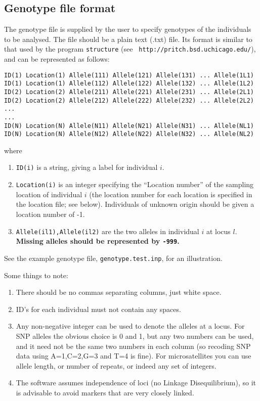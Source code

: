 \documentclass[11pt,titlepage,times,letterpaper]{article}
\begin{document}
\subsection{Genotype file format}
\label{inputfile}

The genotype file is supplied by the user to specify genotypes of the
individuals to be analysed. The file should be a plain text (.txt) file.
Its format is similar to that
used by the program {\tt structure} (see {\tt
http://pritch.bsd.uchicago.edu/}), and can be represented as follows:

\begin{verbatim}
ID(1) Location(1) Allele(111) Allele(121) Allele(131) ... Allele(1L1)
ID(1) Location(1) Allele(112) Allele(122) Allele(132) ... Allele(1L2)
ID(2) Location(2) Allele(211) Allele(221) Allele(231) ... Allele(2L1)
ID(2) Location(2) Allele(212) Allele(222) Allele(232) ... Allele(2L2)
...
...
ID(N) Location(N) Allele(N11) Allele(N21) Allele(N31) ... Allele(NL1)
ID(N) Location(N) Allele(N12) Allele(N22) Allele(N32) ... Allele(NL2)
\end{verbatim}
where
\begin{enumerate}
\item{\tt ID(i)} is a string, giving a label for individual $i$.
\item{\tt Location(i)} is an integer specifying the ``Location number'' of
the sampling location
of individual $i$ (the location number for each location 
is specified in the location file; see below). Individuals of unknown
origin should be given a location number of -1.
\item{{\tt Allele(il1),Allele(il2)}} are the two alleles in
individual $i$ at locus $l$. {\bf Missing alleles should
be represented by {\tt -999}.}
\end{enumerate}
See the example genotype file, {\tt genotype.test.inp}, for an illustration.

Some things to note:
\begin{enumerate}
\item There should be no commas separating columns, just white space.
\item ID's for each individual must not contain any spaces.
\item Any non-negative integer can be used to denote the alleles at a locus.
For SNP alleles the obvious choice is 0 and 1, but any two numbers can be used,
and it need not be the same two numbers in each column (so recoding SNP data 
using A=1,C=2,G=3 and T=4 is fine).  For microsatellites you can use 
allele length, or number of repeats, or indeed any set of integers.
\item The software assumes independence of loci (no Linkage Disequilibrium),
so it is advisable to avoid markers that are very closely linked.
\end{enumerate}
\end{document}
